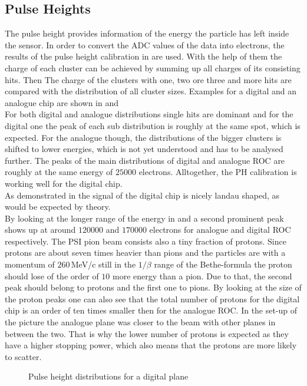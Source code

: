 \subsection{Pulse Heights}
The pulse height provides information of the energy the particle has left inside the sensor. In order to convert the \ac{ADC} values of the data into electrons, the results of the pulse height calibration in  are used. With the help of them the charge of each cluster can be achieved by summing up all charges of its consisting hits. Then The charge of the clusters with one, two ore three and more hits are compared with the distribution of all cluster sizes. Examples for a digital and an analogue chip are shown in  and \\
For both digital and analogue distributions single hits are dominant and for the digital one the peak of each sub distribution is roughly at the same spot, which is expected. For the analogue though, the distributions of the bigger clusters is shifted to lower energies, which is not yet understood and has to be analysed further. The peaks of the main distributions of digital and analogue \ac{ROC} are roughly at the same energy of $25000$ electrons. Alltogether, the \ac{PH} calibration is working well for the digital chip.\\
As demonstrated in  the signal of the digital chip is nicely landau shaped, as would be expected by theory.\\
By looking at the longer range of the energy in  and  a second prominent peak shows up at around $120000$ and $170000$ electrons for analogue and digital \ac{ROC} respectively. The \ac{PSI} pion beam consists also a tiny fraction of protons. Since protons are about seven times heavier than pions and the particles are with a momentum of $260\,$MeV/c still in the $1/\beta$ range of the Bethe-formula  the proton should lose of the order of $10$ more energy than a pion. Due to that, the second peak should belong to protons and the first one to pions. By looking at the size of the proton peaks one can also see that the total number of protons for the digital chip is an order of ten times smaller then for the analogue \ac{ROC}. In the set-up of the picture the analogue plane was closer to the beam with other planes in between the two. That is why the lower number of protons is expected as they have a higher stopping power, which also means that the protons are more likely to scatter. 
\newpage
\begin{figure}[ht]
	\centering
	\hfill
	\caption{Pulse height distributions for a digital plane}
	\label{pphmap1}
\end{figure}\no
